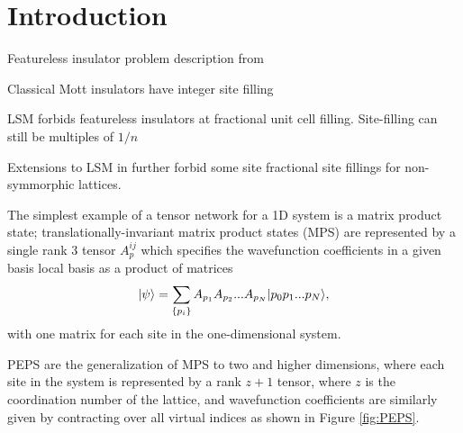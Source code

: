 
\section{Introduction}


Featureless insulator problem description from   
\bi 
\item Classical Mott insulators have integer site filling
\item LSM forbids featureless insulators at fractional unit cell 
filling. Site-filling can still be multiples of $1/n$
\item Extensions to LSM in  further 
forbid some site fractional site fillings for non-symmorphic lattices.
\ei 

The simplest example of a tensor network for a 1D system is a matrix 
product state; translationally-invariant matrix product states (MPS) 
are represented by a single rank 3 tensor $A_p^{ij}$ which specifies 
the wavefunction coefficients in a given basis local basis as a 
product of matrices $$\vert \psi \rangle = \sum\limits_{\{p_i\}} A_{p_1} 
A_{p_2} ... A_{p_N} \vert p_0 p_1 ... p_N \rangle,$$ with one matrix for each 
site in the one-dimensional system.

PEPS are the generalization of MPS to two and higher dimensions, where 
each site in the system is represented by a rank $z+1$ tensor, where 
$z$ is the coordination number of the lattice, and wavefunction 
coefficients are similarly given by contracting over all virtual 
indices as shown in Figure \ref{fig:PEPS}.\cite{verstraete2004}